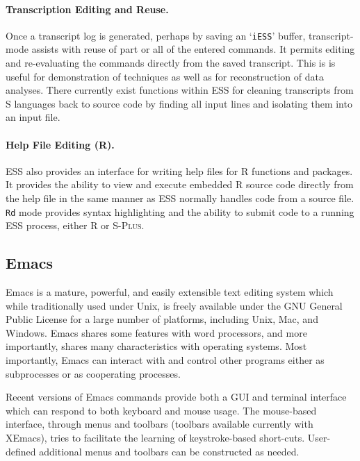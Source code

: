 \documentclass{article}
\newcommand*{\Splus}{\textsc{S-Plus}}
\newcommand{\stexttt}[1]{{\small\texttt{#1}}}
\newcommand{\file}[1]{`\stexttt{#1}'}
\begin{document}
\paragraph{Transcription Editing and Reuse.}
Once a transcript log is generated, perhaps by saving an \file{iESS}
buffer, transcript-mode assists with reuse of part or all of the
entered commands.  It permits editing and re-evaluating the commands
directly from the saved transcript.  This is is useful for
demonstration of techniques as well as for reconstruction of data
analyses.  There currently exist functions within ESS for cleaning
transcripts from S languages back to source code by finding all input
lines and isolating them into an input file.

\paragraph{Help File Editing (R).}
ESS also provides an interface for writing help files for R functions
and packages.  It provides the ability to view and execute embedded R
source code directly from the help file in the same manner as ESS
normally handles code from a source file.  \stexttt{Rd} mode provides
syntax highlighting and the ability to submit code to a running ESS
process, either R or \Splus.

\subsection{Emacs}
\label{sec:ESS:emacs}

Emacs \citep{RMS:2000} is a mature, powerful, and easily extensible
text editing system which while traditionally used under Unix, is
freely available under the GNU General Public License for a large
number of platforms, including Unix, Mac, and Windows.  Emacs shares
some features with word processors, and more importantly, shares many
characteristics with operating systems.  Most importantly, Emacs can
interact with and control other programs either as subprocesses or as
cooperating processes.

Recent versions of Emacs commands provide both a GUI and terminal
interface which can respond to both keyboard and mouse usage.  The
mouse-based interface, through menus and toolbars (toolbars available
currently with XEmacs), tries to facilitate the learning of
keystroke-based short-cuts.  User-defined additional menus and
toolbars can be constructed as needed.
\end{document}
